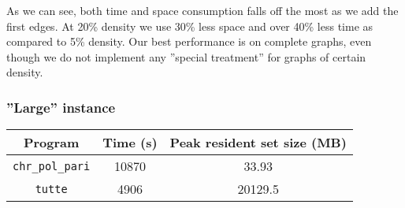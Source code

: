 \documentclass[a4paper]{article}
\newcommand{\code}{\texttt}
\begin{document}
\begin{center}
\end{center}

As we can see, both time and space consumption falls off the most as we add the first edges. At 20\% density we use 30\% less space and over 40\% less time as compared to 5\% density. Our best performance is on complete graphs, even though we do not implement any ''special treatment'' for graphs of certain density.

\subsubsection{''Large'' instance}

\begin{center}
 \begin{tabular}{|c|c|c|} \hline
  Program & Time (s) & Peak resident set size (MB) \\ \hline
  \code{chr\_pol\_pari} & 10870 & 33.93 \\ \hline
  \code{tutte} & 4906 & 20129.5 \\ \hline
 \end{tabular}

\end{center}


\end{document}
